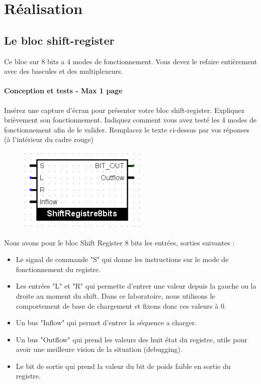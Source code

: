 \documentclass[a4paper]{article} %
\begin{document}
\section {Réalisation}
\subsection{Le bloc shift-register}
Ce bloc sur 8 bits a 4 modes de fonctionnement. Vous devez le refaire entièrement avec des bascules et des multiplexeurs.

\begin{tcolorbox}[colframe=Monokaimagenta,colback=white, breakable, enhanced]
\paragraph{Conception et tests - Max 1 page}
Insérez une capture d’écran pour présenter votre bloc shift-register. Expliquez brièvement son fonctionnement.
Indiquez comment vous avez testé les 4 modes de fonctionnement afin de le valider.
Remplacez le texte ci-dessus par vos réponses (à l’intérieur du cadre rouge)\\

\begin{figure}[H]
	\centering
	\includegraphics[scale=0.5]{src/SR_8b_bloc}
	\label{fig:SR_8b_bloc}
\end{figure}
Nous avons pour le bloc Shift Register 8 bits les entrées, sorties suivantes : 
\begin{itemize}
	\item Le signal de commande "S" qui donne les instructions sur le mode de fonctionnement du registre.
	\item Les entrées "L" et "R" qui permette d'entrer une valeur depuis la gauche ou la droite au moment du shift. 
	Dans ce laboratoire, nous utilisons le comportement de base de chargement et fixons donc ces valeurs à 0.
	\item Un bus "Inflow" qui permet d'entrer la séquence a charger.
	\item Un bus "Outflow" qui prend les valeurs des huit état du registre, utile pour avoir une meilleure vision de la situation (debugging).
	\item Le bit de sortie qui prend la valeur du bit de poids faible en sortie du registre.
\end{itemize}


\end{tcolorbox}
\end{document}
